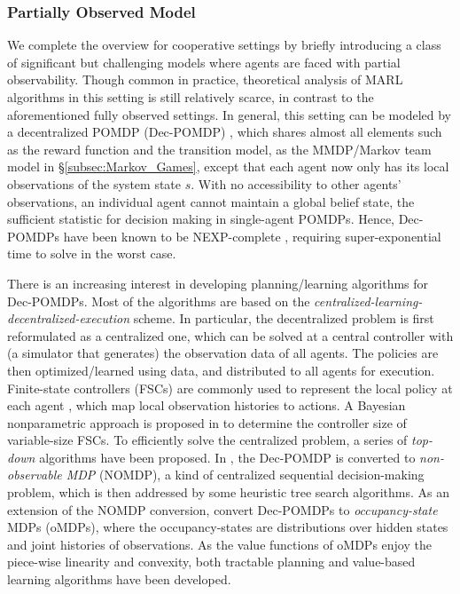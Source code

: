 \subsubsection{Partially Observed Model}\label{subsec:partially_observed}

We complete the overview for cooperative settings  by briefly introducing a class of significant but challenging models where agents are faced with partial  observability. Though common in practice, theoretical analysis of MARL algorithms in this setting is still relatively scarce, in contrast to the aforementioned fully observed settings.  
In general, this setting can be modeled by a decentralized POMDP (Dec-POMDP) \cite{oliehoek2016concise}, which shares almost all elements such as the reward function and the transition model, as the MMDP/Markov team model in \S\ref{subsec:Markov_Games}, except that each agent now only has its local observations of the system state $s$. With no accessibility  to other agents' observations, an  individual agent cannot maintain a global belief state, the sufficient statistic for decision making in single-agent POMDPs. Hence, Dec-POMDPs have been known to be  NEXP-complete \cite{bernstein2002complexity},    requiring super-exponential time to solve in the worst case.  

There is an increasing interest in developing planning/learning algorithms for Dec-POMDPs. 
Most of the algorithms are based on the \emph{centralized-learning-decentralized-execution} scheme. In particular, the  decentralized problem is first reformulated as a centralized one, which can be solved at a central controller with (a simulator that generates) the observation data of all agents. The policies are then optimized/learned using data, and distributed to all agents for  execution.   
Finite-state controllers (FSCs) are commonly used to represent  the local policy at each agent \cite{bernstein2009policy,amato2010optimizing}, which map local observation histories to actions. 
A Bayesian nonparametric approach is proposed in \cite{liu2015stick} to   determine the controller size of variable-size FSCs. 
To efficiently solve the centralized problem, a series of \emph{top-down}  algorithms have been proposed. In \cite{oliehoek2014dec},   the Dec-POMDP is converted  to  \emph{non-observable MDP} (NOMDP), 
a kind of centralized sequential decision-making problem, which is then  addressed by some  heuristic  tree search algorithms. 
As an extension of the NOMDP conversion, 
\cite{dibangoye2016optimally,dibangoye2018learning} convert Dec-POMDPs to   \emph{occupancy-state} MDPs (oMDPs), where the occupancy-states are distributions over hidden states and joint histories of observations. As the value functions of  oMDPs enjoy the piece-wise linearity and convexity, both tractable planning \cite{dibangoye2016optimally} and value-based learning \cite{dibangoye2018learning} algorithms have been developed. 
  
